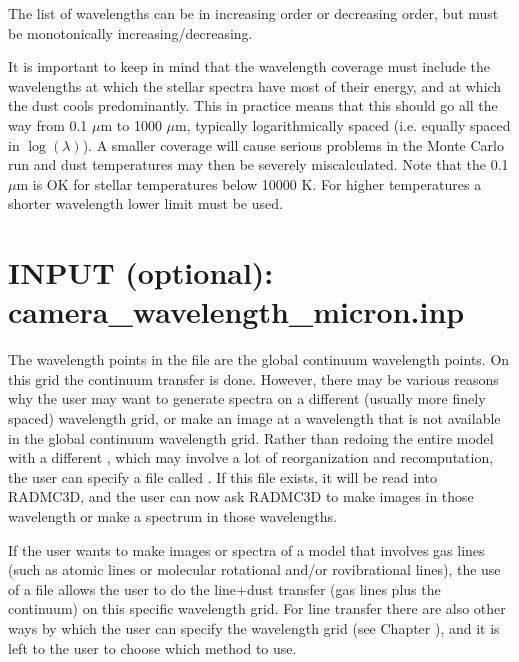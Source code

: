 \documentclass[letterpaper,10pt,english]{sphinxmanual}
\begin{document}
The list of wavelengths can be in increasing order or decreasing order, but
must be monotonically increasing/decreasing.

 It is important to keep in mind that the wavelength
coverage must include the wavelengths at which the stellar spectra have most
of their energy, and at which the dust cools predominantly.  This in
practice means that this should go all the way from 0.1 \(\mu\)m to 1000
\(\mu\)m, typically logarithmically spaced (i.e. equally spaced in
\(\log(\lambda)\)). A smaller coverage will cause serious problems in the Monte
Carlo run and dust temperatures may then be severely miscalculated. Note
that the 0.1 \(\mu\)m is OK for stellar temperatures below 10000 K. For higher
temperatures a shorter wavelength lower limit must be used.


\section{INPUT (optional): camera\_wavelength\_micron.inp}
\label{\detokenize{inputoutputfiles:input-optional-camera-wavelength-micron-inp}}\label{\detokenize{inputoutputfiles:sec-camera-wavelengths}}
The wavelength points in the  file are the
global continuum wavelength points. On this grid the continuum transfer is
done. However, there may be various reasons why the user may want to
generate spectra on a different (usually more finely spaced) wavelength
grid, or make an image at a wavelength that is not available in the global
continuum wavelength grid. Rather than redoing the entire model with a
different , which may involve a lot of
reorganization and recomputation, the user can specify a file called . If this file exists, it will be read into
RADMC\sphinxhyphen{}3D, and the user can now ask RADMC\sphinxhyphen{}3D to make images in those
wavelength or make a spectrum in those wavelengths.

If the user wants to make images or spectra of a model that involves gas
lines (such as atomic lines or molecular rotational and/or ro\sphinxhyphen{}vibrational
lines), the use of a  file allows
the user to do the line+dust transfer (gas lines plus the continuum) on this
specific wavelength grid. For line transfer there are also other ways by
which the user can specify the wavelength grid (see Chapter
{\hyperref[\detokenize{lineradtrans:chap-line-transfer}]{}}), and it is left to the user to choose which method
to use.
\end{document}
